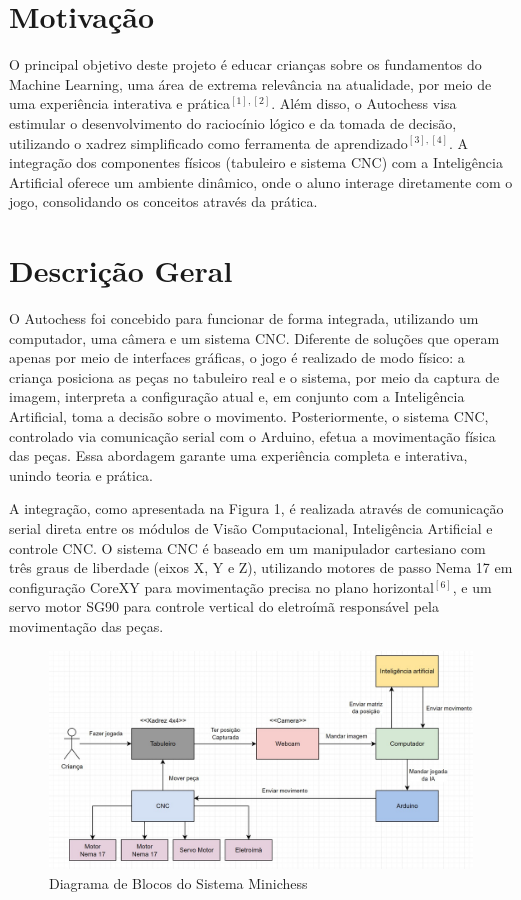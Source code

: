 \documentclass[a4paper,12pt]{article}
\begin{document}
\section{Motivação}  
O principal objetivo deste projeto é educar crianças sobre os fundamentos do Machine Learning, uma área de extrema relevância na atualidade, por meio de uma experiência interativa e prática$^{[1], [2]}$. Além disso, o Autochess visa estimular o desenvolvimento do raciocínio lógico e da tomada de decisão, utilizando o xadrez simplificado como ferramenta de aprendizado$^{[3], [4]}$. A integração dos componentes físicos (tabuleiro e sistema CNC) com a Inteligência Artificial oferece um ambiente dinâmico, onde o aluno interage diretamente com o jogo, consolidando os conceitos através da prática.  

\section{Descrição Geral}  
O Autochess foi concebido para funcionar de forma integrada, utilizando um computador, uma câmera e um sistema CNC. Diferente de soluções que operam apenas por meio de interfaces gráficas, o jogo é realizado de modo físico: a criança posiciona as peças no tabuleiro real e o sistema, por meio da captura de imagem, interpreta a configuração atual e, em conjunto com a Inteligência Artificial, toma a decisão sobre o movimento. Posteriormente, o sistema CNC, controlado via comunicação serial com o Arduino, efetua a movimentação física das peças. Essa abordagem garante uma experiência completa e interativa, unindo teoria e prática.  

A integração, como apresentada na Figura 1, é realizada através de comunicação serial direta entre os módulos de Visão Computacional, Inteligência Artificial e controle CNC. O sistema CNC é baseado em um manipulador cartesiano com três graus de liberdade (eixos X, Y e Z), utilizando motores de passo Nema 17 em configuração CoreXY para movimentação precisa no plano horizontal$^{[6]}$, e um servo motor SG90 para controle vertical do eletroímã responsável pela movimentação das peças.  



\begin{figure}[H]  
    \centering  
    \includegraphics[width=1.0\textwidth]{images/diagrama.jpeg}   
    \caption{Diagrama de Blocos do Sistema Minichess}  
    \label{fig:diagrama}  
\end{figure}  
\end{document}
